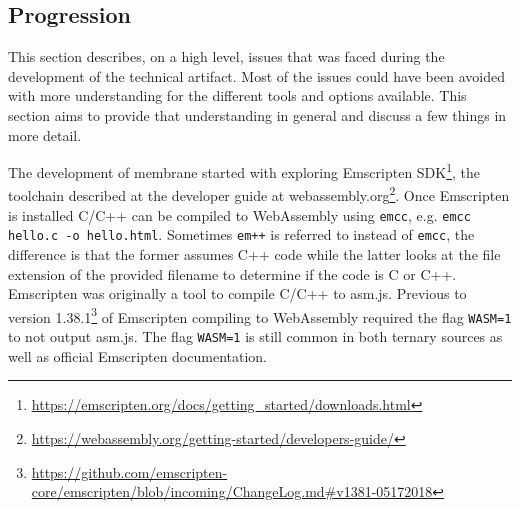 
\subsection{Progression}

\begin{comment}
I progressions-kapitlet beskriver vi det en person som återupprepar arbetet behöver veta. Vilka viktiga designbeslut som tagits under processen samt hur dessa beslut implementerats. Eftersom programkoden och rapporten kommer ligga kvar under väldigt lång tid så innebär det att vi måste göra det så lätt som möjligt att följa hur arbetet utvecklats under genomförandet/implementationen. (Ett begränsat exempel på hur man kan lägga upp detta finns tillgängligt nedan).
\end{comment}

This section describes, on a high level, issues that was faced during the development of the technical artifact. Most of the issues could have been avoided with more understanding for the different tools and options available. This section aims to provide that understanding in general and discuss a few things in more detail.

The development of membrane started with exploring Emscripten SDK\footnote{\url{https://emscripten.org/docs/getting_started/downloads.html}}, 
the toolchain described at the developer guide at webassembly.org\footnote{\url{https://webassembly.org/getting-started/developers-guide/}}. Once Emscripten is installed C/C++ can be compiled to WebAssembly using \texttt{emcc}, e.g. \verb|emcc hello.c -o hello.html|. Sometimes \texttt{em++} is referred to instead of \texttt{emcc}, the difference is that the former assumes C++ code while the latter looks at the file extension of the provided filename to determine if the code is C or C++. Emscripten was originally a tool to compile C/C++ to asm.js. Previous to version 1.38.1\footnote{\url{https://github.com/emscripten-core/emscripten/blob/incoming/ChangeLog.md\#v1381-05172018}} of Emscripten compiling to WebAssembly required the flag \texttt{WASM=1} to not output asm.js. The flag \texttt{WASM=1} is still common in both ternary sources as well as official Emscripten documentation.

